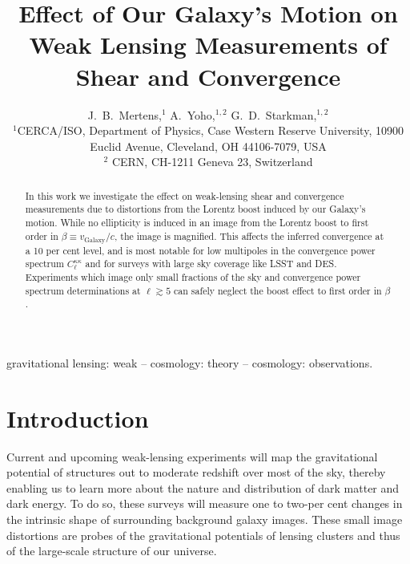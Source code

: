 \documentclass[useAMS,fleqn, usenatbib]{mn2e}
\begin{document}
\title[Lorentz-boost effects on shear and convergence]{Effect of Our Galaxy's Motion on Weak Lensing Measurements of Shear and Convergence}

\author[Mertens J.~B., Yoho A., and Starkman G. D.]{J.~B.~Mertens,$^1$ A.~Yoho,$^{1,2}$ 
G.~D.~Starkman,$^{1,2}$ \\
$^1$CERCA/ISO, Department of Physics, Case Western Reserve University,
10900 Euclid Avenue, Cleveland, OH 44106-7079, USA\\
$^{2}$ CERN, CH-1211 Geneva 23, Switzerland}


\maketitle
\begin{abstract}
In this work we investigate the effect on weak-lensing shear and convergence
measurements due to distortions from the Lorentz boost induced by our Galaxy's motion.
While no ellipticity is induced in an image from the Lorentz boost to first order in 
$\beta\equiv v_{\text{Galaxy}}/c$, the image is magnified.
This affects the inferred convergence at a 10 per cent level, and is most notable for low
multipoles in the convergence power spectrum $C^{\kappa\kappa}_{\ell}$ and  for surveys with
large sky coverage like LSST and DES. Experiments which image only small fractions of
the sky and convergence power spectrum determinations at $\ell\gtrsim 5$ can safely
neglect the boost effect to first order in $\beta$.
\end{abstract}

\begin{keywords}
gravitational lensing: weak -- cosmology: theory -- cosmology: observations.
\end{keywords}
 

\section{Introduction}

Current and upcoming weak-lensing experiments  will map the gravitational potential of structures
out to moderate redshift over most of the sky, thereby enabling us to learn more about the 
nature and distribution of dark matter and dark energy.
To do so, these surveys will measure one to two-per cent changes in the intrinsic shape of surrounding background galaxy images. 
These small image distortions are probes of the 
gravitational potentials of lensing  clusters and thus of the  large-scale structure of our universe. 
\end{document}
